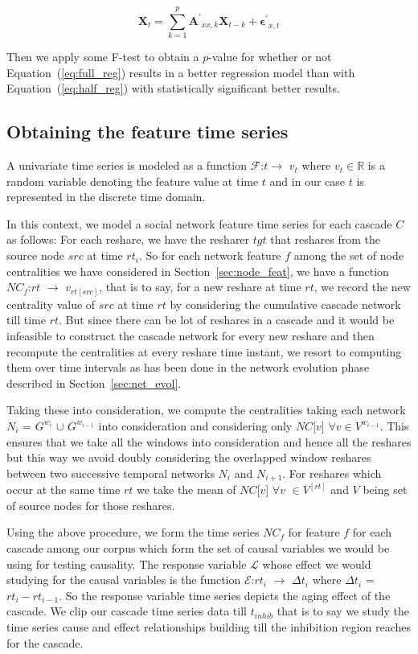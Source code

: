 \documentclass[smallextended]{svjour3}       %
\theoremstyle{definition}
\begin{document}
\begin{equation}
\mathbf{X}_t = \sum_{k=1}^p \mathbf{A^{'}}_{xx,k} \mathbf{X}_{t-k} + \mathbf{\epsilon^{'}}_{x,t}
\label{eq:half_reg}
\end{equation}

Then we apply some F-test to obtain a $p$-value for whether or not Equation~(\ref{eq:full_reg}) results in a better regression model than with Equation~(\ref{eq:half_reg}) with statistically significant better results.

\subsection{Obtaining the feature time series}
A univariate time series is modeled as a function $ \mathcal{F}$:$t \rightarrow$ $v_t $ where $v_t \in \mathbb{R} $ is a random variable denoting the feature value at time $t$ and in our case $t$ is represented in the discrete time domain. 

In this context, we model a social network feature time series for each cascade $C$ as follows: For each reshare, we have the resharer $tgt$ that reshares from the source node $src$ at time $rt_i$. So for each network feature $f$ among the set of node centralities we have considered in Section~\ref{sec:node_feat}, we have a function $\textit{NC}_f$:$rt$ $\rightarrow$ $v_{rt[src]}$, that is to say, for a new reshare at time $rt$, we record the new centrality value of $src$ at time $rt$ by considering the cumulative cascade network till time $rt$. But since there can be lot of reshares in a cascade and it would be infeasible to construct the cascade network for every new reshare and then recompute the centralities at every reshare time instant, we resort to computing them over time intervals as has been done in the network evolution phase described in Section~\ref{sec:net_evol}. 

Taking these into consideration, we compute the centralities taking each network $N_i$ = $G^{w_i}$ $\cup$ $G^{w_{i-1}}$ into consideration and considering only $\textit{{NC}$[$v$]$}$ $\forall v \in V^{w_{i-1}}$. This ensures that we take all the windows into consideration and hence all the reshares but this way we avoid doubly considering the overlapped window reshares between two successive temporal networks $N_i$ and $N_{i+1}$. For reshares which occur at the same time $rt$ we take the mean of $NC$[$v$] $\forall v$ $\in V^{[rt]}$ and $V$ being set of source nodes for those reshares.

Using the above procedure, we form the time series $NC_f$ for feature $f$ for each cascade among our corpus which form the set of causal variables we would be using for testing causality. The response variable $\mathcal{L}$ whose effect we would studying for the causal variables is the function $\mathcal{E}$:$rt_i$ $\rightarrow$ $\Delta t_i$ where $\Delta t_i$ = $rt_i - rt_{i-1}$. So the response variable time series depicts the aging effect of the cascade. We clip our cascade time series data till $t_{inhib}$ that is to say we study the time series cause and effect relationships building till the inhibition region reaches for the cascade. 
\end{document}
